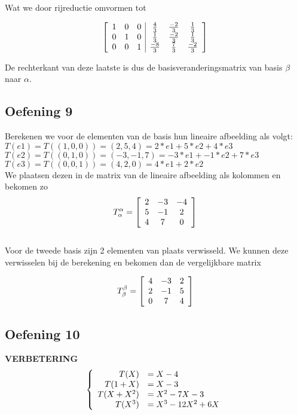 \documentclass[lineaire_algebra_oplossingen.tex]{subfiles}
\begin{document}
Wat we door rijreductie omvormen tot

\[
\left[
\begin{array}{ c c c | c c c }
1 & 0 & 0 & \frac{4}{3} & \frac{-2}{3} & \frac{1}{3}\\
0 & 1 & 0 & \frac{1}{3} & \frac{-2}{3} & \frac{1}{3}\\
0 & 0 & 1 & \frac{-8}{3} & \frac{7}{3} & \frac{-2}{3}
\end{array}
\right]
\]

De rechterkant van deze laatste is dus de basisveranderingsmatrix van basis $\beta$ naar $\alpha$.

\subsection{Oefening 9}

Berekenen we voor de elementen van de basis hun lineaire afbeelding als volgt:\\

$T(e1) = T( (1,0,0) ) = (2,5,4) = 2 * e1 + 5 * e2 + 4 * e3$\\

$T(e2) = T( (0,1,0) ) = (-3,-1,7) = -3 * e1 + -1 * e2 + 7 * e3$\\

$T(e3) = T( (0,0,1) ) = (4,2,0) = 4 * e1 + 2 * e2$\\

We plaatsen dezen in de matrix van de lineaire afbeelding als kolommen en bekomen zo\\

\[
T^{\alpha}_{\alpha} =
\left[
\begin{array}{c c c}
2 & -3 & -4\\
5 & -1 & 2\\
4 & 7 & 0
\end{array}
\right]
\]\\

Voor de tweede basis zijn 2 elementen van plaats verwisseld. We kunnen deze verwisselen bij de berekening en bekomen dan de vergelijkbare matrix

\[
T^{\beta}_{\beta} =
\left[
\begin{array}{c c c}
4 & -3 & 2\\
2 & -1 & 5\\
0 & 7 & 4
\end{array}
\right]
\]


\subsection{Oefening 10}
\textbf{VERBETERING}
\[
\left\lbrace
\begin{array}{r l}
T(X) &= X-4\\
T(1+X) &= X-3\\
T(X+X^2) &= X^2-7X-3\\
T(X^3) &= X^3-12X^2+6X\\
\end{array}
\right.
\]
\end{document}
